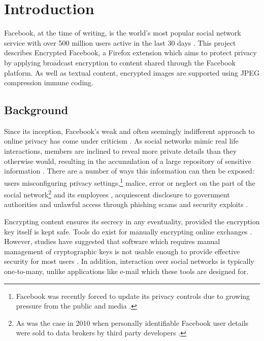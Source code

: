 \chapter{Introduction}\label{ch:introduction}

Facebook, at the time of writing, is the world's most popular social network service with over 500 million users active in the last 30 days \cite{fb-factsheet}. This project describes Encrypted Facebook, a Firefox extension which aims to protect privacy by applying broadcast encryption to content shared through the Facebook platform. As well as textual content, encrypted images are supported using JPEG compression immune coding.

\section{Background}
\label{sec:background}

Since its inception, Facebook's weak and often seemingly indifferent approach to online privacy has come under criticism \cite{fb-cipc}. As social networks mimic real life interactions, members are inclined to reveal more private details than they otherwise would, resulting in the accumulation of a large repository of sensitive information \cite{gross}. There are a number of ways this information can then be exposed: users misconfiguring privacy settings,\footnote{Facebook was recently forced to update its privacy controls due to growing pressure from the public and media \cite{fb-priv}.} malice, error or neglect on the part of the social network\footnote{As was the case in 2010 when personally identifiable Facebook user details were sold to data brokers by third party developers \cite{fb-ids}.} and its employees \cite{snoop}, acquiescent disclosure to government authorities \cite{fb-gov} and unlawful access through phishing scams \cite{fb-phish} and security exploits \cite{rockyou}.

Encrypting content ensures its secrecy in any eventuality, provided the encryption key itself is kept safe. Tools do exist for manually encrypting online exchanges \cite{firegpg}. However, studies have suggested that software which requires manual management of cryptographic keys is not usable enough to provide effective security for most users \cite{johnny}. In addition, interaction over social networks is typically one-to-many, unlike applications like e-mail which these tools are designed for.

